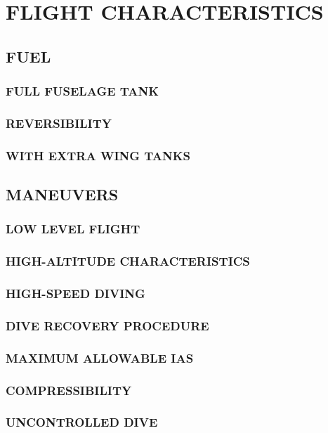 \chapter{FLIGHT CHARACTERISTICS}
\minitoc
\cleardoublepage


\section{FUEL}
\subsection{FULL FUSELAGE TANK}
\subsection{REVERSIBILITY}
\subsection{WITH EXTRA WING TANKS}


\section{MANEUVERS}
\subsection{LOW LEVEL FLIGHT}
\subsection{HIGH-ALTITUDE CHARACTERISTICS}
\subsection{HIGH-SPEED DIVING}
\subsection{DIVE RECOVERY PROCEDURE}
\subsection{MAXIMUM ALLOWABLE IAS}
\subsection{COMPRESSIBILITY}
\subsection{UNCONTROLLED DIVE}
